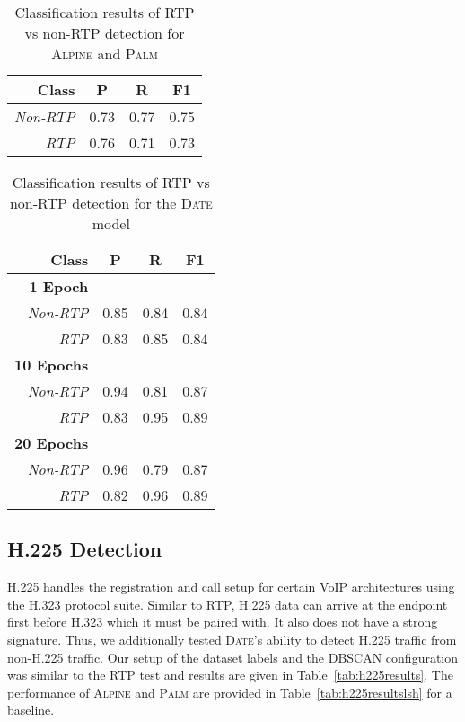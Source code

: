 \begin{table} [h!]
\centering
\begin{tabular}{| r | c | c | c |}
\hline
Class & P & R & F1 \\
\hline
\textit{Non-RTP} & 0.73 & 0.77 & 0.75 \\
\textit{RTP} & 0.76 & 0.71 & 0.73 \\
\hline
\end{tabular}
\caption{Classification results of RTP vs non-RTP detection for \textsc{Alpine} and \textsc{Palm}}
\label{tab:rtpresultslsh}
\end{table}

\begin{table} [h!]
\centering
\begin{tabular}{| r | c | c | c |}
\hline
Class & P & R & F1 \\
\hline
\textbf{1 Epoch} &&& \\
\textit{Non-RTP} & 0.85 & 0.84 & 0.84 \\
\textit{RTP} & 0.83 & 0.85 & 0.84 \\
\hline
\textbf{10 Epochs} &&& \\
\textit{Non-RTP} & 0.94 & 0.81 & 0.87 \\
\textit{RTP} & 0.83 & 0.95 & 0.89 \\
\hline
\textbf{20 Epochs} &&& \\
\textit{Non-RTP} & 0.96 & 0.79 & 0.87 \\
\textit{RTP} & 0.82 & 0.96 & 0.89 \\
\hline
\end{tabular}
\caption{Classification results of RTP vs non-RTP detection for the \textsc{Date} model}
\label{tab:rtpresults}
\end{table}

\subsection{H.225 Detection}
H.225 handles the registration and call setup for certain VoIP architectures using the H.323 protocol suite. Similar to RTP, H.225 data can arrive at the endpoint first before H.323 which it must be paired with. It also does not have a strong signature. Thus, we additionally tested \textsc{Date}'s ability to detect H.225 traffic from non-H.225 traffic. Our setup of the dataset labels and the DBSCAN configuration was similar to the RTP test and results are given in Table~\ref{tab:h225results}. The performance of \textsc{Alpine} and \textsc{Palm} are provided in Table~\ref{tab:h225resultslsh} for a baseline.

